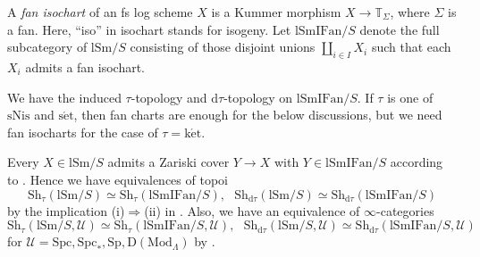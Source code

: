 \documentclass[10pt]{amsart}
\theoremstyle{definition}
\theoremstyle{remark}
\numberwithin{equation}{subsection}
\newcommand{\T}{\mathbb{T}}
\newcommand{\cU}{\mathcal{U}}
\newcommand{\Shv}{\mathrm{Sh}}
\newcommand{\Spt}{\mathrm{Sp}}
\newcommand{\DLambda}{\mathrm{D}(\mathrm{Mod}_{\Lambda})}
\newcommand{\lSm}{\mathrm{lSm}}
\newcommand{\lSmIFan}{\mathrm{lSmIFan}}
\newcommand{\Spc}{\mathrm{Spc}}
\newcommand{\dtau}{\mathrm{d}\tau}
\newcommand{\sNis}{\mathrm{sNis}}
\newcommand{\ketale}{\mathrm{k\acute{e}t}}
\newcommand{\setale}{\mathrm{s\acute{e}t}}
\begin{document}
A \emph{fan isochart} of an fs log scheme $X$ is a Kummer morphism $X\to \T_\Sigma$, where $\Sigma$ is a fan.
Here, ``iso'' in isochart stands for isogeny.
Let $\lSmIFan/S$ denote the full subcategory of $\lSm/S$ consisting of those disjoint unions $\amalg_{i\in I} X_i$ such that each $X_i$ admits a fan isochart.

We have the induced $\tau$-topology and $\dtau$-topology on $\lSmIFan/S$.
If $\tau$ is one of $\sNis$ and $\setale$, then fan charts are enough for the below discussions, but we need fan isocharts for the case of $\tau=\ketale$.

Every $X\in \lSm/S$ admits a Zariski cover $Y\to X$ with $Y\in \lSmIFan/S$ according to \cite[Proposition II.2.3.7]{Ogu}.
Hence we have equivalences of topoi
\[
\Shv_{\tau}(\lSm/S)
\simeq
\Shv_{\tau}(\lSmIFan/S),
\text{ }
\Shv_{\dtau}(\lSm/S)
\simeq
\Shv_{\dtau}(\lSmIFan/S)
\]
by the implication (i)$\Rightarrow$(ii) in \cite[Th\'eor\`eme III.4.1]{SGA4}.
Also, we have an equivalence of $\infty$-categories
\begin{equation}
\Shv_{\tau}(\lSm/S,\cU)
\simeq
\Shv_{\tau}(\lSmIFan/S,\cU),
\text{ }
\Shv_{\dtau}(\lSm/S,\cU)
\simeq
\Shv_{\dtau}(\lSmIFan/S,\cU)
\end{equation}
for $\cU=\Spc,\Spc_*,\Spt,\DLambda$ by \cite[Proposition A.3.11]{Mann}.
\end{document}
